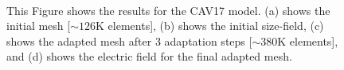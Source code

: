 \documentclass[review,authoryear,12pt]{elsarticle_summary_report}
\begin{document}
\begin{landscape}
\begin{figure}[ph!]
\centering
{}
\hspace*{50pt}
\\
\hspace*{50pt}
\caption{This Figure shows the results for the CAV17 model. (a) shows the initial mesh [$\sim126\text{K}$ elements], (b) shows the initial size-field, (c) shows the adapted mesh after 3 adaptation steps [$\sim380\text{K}$ elements], and (d) shows the electric field for the final adapted mesh.}
\end{figure}
\end{landscape}
\end{document}
